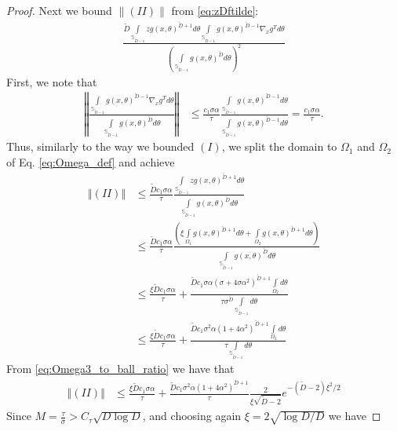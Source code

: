 \documentclass[12pt]{article}
\theoremstyle{remark}
\newcommand{\norm}[1]{\left\Vert #1 \right\Vert}
\newcommand{\wtilde}[1]{\widetilde{#1}}
\newcommand{\stau}{\tau}
\begin{document}
\begin{appendices}
\begin{proof}
Next we bound $\|(II)\|$ from \eqref{eq:zDftilde}:
\begin{align*}
\frac{\wtilde D\int\limits_{\mathbb{S}_{\wtilde D-1}}z g(x,\theta)^{\wtilde D+1} d\theta \int\limits_{\mathbb{S}_{\wtilde D-1}} g(x,\theta)^{\wtilde D-1}\nabla_x g^T d\theta}
{\left(\int\limits_{\mathbb{S}_{\wtilde D-1}}g(x,\theta)^{\wtilde D} d\theta\right)^2}
\end{align*}
First, we note that 
\begin{align*}
\norm{\frac{\int\limits_{\mathbb{S}_{\wtilde D-1}} g(x,\theta)^{\wtilde D-1}\nabla_x g^T d\theta}
{\int\limits_{\mathbb{S}_{\wtilde D-1}}g(x,\theta)^{\wtilde D} d\theta}} & \leq \frac{c_1 \sigma\alpha}{\tau} \frac{\int\limits_{\mathbb{S}_{\wtilde D-1}} g(x,\theta)^{\wtilde D-1} d\theta}
{\int\limits_{\mathbb{S}_{\wtilde D-1}}g(x,\theta)^{\wtilde D-1} d\theta} = \frac{c_1 \sigma \alpha}{\tau}.
\end{align*}
Thus, similarly to the way we bounded $(I)$, we split the domain to $\Omega_1$ and $\Omega_2$ of Eq. \eqref{eq:Omega_def} and achieve
\begin{align*}
\norm{(II)} &\leq \frac{\wtilde Dc_1 \sigma\alpha}{\tau}\frac{\int\limits_{\mathbb{S}_{\wtilde D-1}}z g(x,\theta)^{\wtilde D+1} d\theta}
{\int\limits_{\mathbb{S}_{\wtilde D-1}}g(x,\theta)^{\wtilde D} d\theta}
\\
&\leq \frac{\wtilde Dc_1 \sigma\alpha}{\tau} \frac{ \left(\xi\int\limits_{\Omega_1} g(x,\theta)^{\wtilde D+1}  d\theta + \int\limits_{\Omega_2} g(x,\theta)^{\wtilde D+1}  d\theta \right)}
{\int\limits_{\mathbb{S}_{\wtilde D-1}}g(x,\theta)^{\wtilde D} d\theta}
\\
&\leq  \frac{\xi\wtilde Dc_1 \sigma\alpha}{\tau} + \frac{\wtilde Dc_1 \sigma\alpha ( \sigma + 4\sigma \alpha^2)^{\wtilde D+1}\int\limits_{\Omega_2}  d\theta }
{\tau \sigma^{\wtilde D}\int\limits_{\mathbb{S}_{\wtilde D-1}} d\theta}
\\
&\leq  \frac{\xi\wtilde Dc_1 \sigma\alpha}{\tau} + \frac{\wtilde Dc_1 \sigma^2\alpha ( 1 + 4\alpha^2)^{\wtilde D+1}\int\limits_{\Omega_2}  d\theta }
{\tau \int\limits_{\mathbb{S}_{\wtilde D-1}} d\theta}
\end{align*}
From \eqref{eq:Omega3_to_ball_ratio} we have that 
\begin{align*}
\norm{(II)} &\leq  \frac{\xi\wtilde Dc_1 \sigma\alpha}{\tau} + \frac{\wtilde Dc_1 \sigma^2\alpha ( 1 + 4\alpha^2)^{\wtilde D+1}}
{\tau} \frac{2}{\xi\sqrt{\wtilde D-2}}e^{-(\wtilde D - 2 )\xi^2/2}
\end{align*}
Since $M = \frac{\tau}{\sigma}>C_\stau\sqrt{D\log D}$, and choosing again $\xi = 2\sqrt{\log D/D}$ we have


\end{proof}
\end{appendices}
\end{document}
